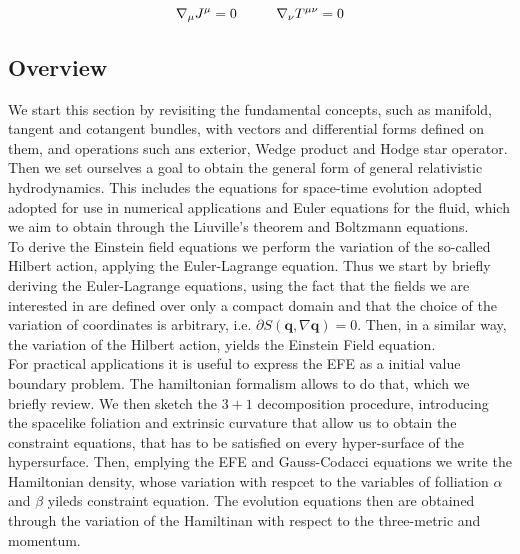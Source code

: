\documentclass[11pt,a4paper,headinclude=true,DIV=14,BCOR=8mm,chapterprefix,listof=totoc,twoside,openright,abstracton]{scrbook}
\begin{document}
\begin{equation}
    \nabla_{\mu}J^{\mu} =0 \hspace{10mm}\nabla_{\nu}T^{\mu\nu} =0
\end{equation}

\subsection{Overview}

We start this section by revisiting the fundamental concepts, such as manifold, tangent and cotangent bundles, with vectors and differential forms defined on them, and operations such ans exterior, Wedge product and Hodge star operator. \\

Then we set ourselves a goal to obtain the general form of general relativistic hydrodynamics. This includes the equations for space-time evolution adopted adopted for use in numerical applications and Euler equations for the fluid, which we aim to obtain through the Liuville's theorem and Boltzmann equations. \\

To derive the Einstein field equations we perform the variation of the so-called Hilbert action, applying the Euler-Lagrange equation. Thus we start by briefly deriving the Euler-Lagrange equations, using the fact that the fields we are interested in are defined over only a compact domain and that the choice of the variation of coordinates is arbitrary, i.e. $\partial S(\boldsymbol{q}, \nabla \boldsymbol{q}) = 0$. Then, in a similar way, the variation of the Hilbert action, yields the Einstein Field equation. \\

For practical applications it is useful to express the EFE as a initial value boundary problem. The hamiltonian formalism allows to do that, which we briefly review. We then sketch the $3+1$ decomposition procedure, introducing the spacelike foliation and extrinsic curvature that allow us to obtain the constraint equations, that has to be satisfied on every hyper-surface of the hypersurface. Then, emplying the EFE and Gauss-Codacci equations we write the Hamiltonian density, whose variation with respcet to the variables of folliation $\alpha$ and $\beta$ yileds constraint equation. The evolution equations then are obtained through the variation of the Hamiltinan with respect to the three-metric and momentum. \\
\end{document}
